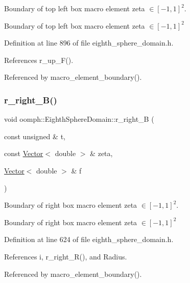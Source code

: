 Boundary of top left box macro element zeta $ \in [-1,1]^2 $. 

Boundary of top left box macro element zeta $ \in [-1,1]^2 $ 

Definition at line 896 of file eighth\+\_\+sphere\+\_\+domain.\+h.



References r\+\_\+up\+\_\+\+F().



Referenced by macro\+\_\+element\+\_\+boundary().

\mbox{\label{classoomph_1_1EighthSphereDomain_ac013c364bfe2f0bb1d3393696149d249}} 
\subsubsection{\texorpdfstring{r\+\_\+right\+\_\+\+B()}{r\_right\_B()}}
{\footnotesize\ttfamily void oomph\+::\+Eighth\+Sphere\+Domain\+::r\+\_\+right\+\_\+B (\begin{DoxyParamCaption}\item[{const unsigned \&}]{t,  }\item[{const \hyperlink{classoomph_1_1Vector}{Vector}$<$ double $>$ \&}]{zeta,  }\item[{\hyperlink{classoomph_1_1Vector}{Vector}$<$ double $>$ \&}]{f }\end{DoxyParamCaption})\hspace{0.3cm}{\ttfamily [private]}}



Boundary of right box macro element zeta $ \in [-1,1]^2 $. 

Boundary of right box macro element zeta $ \in [-1,1]^2 $ 

Definition at line 624 of file eighth\+\_\+sphere\+\_\+domain.\+h.



References i, r\+\_\+right\+\_\+\+R(), and Radius.



Referenced by macro\+\_\+element\+\_\+boundary().

\mbox{\label{classoomph_1_1EighthSphereDomain_a7a4a1a98b542afd49a5ec8abfda287fc}} 
